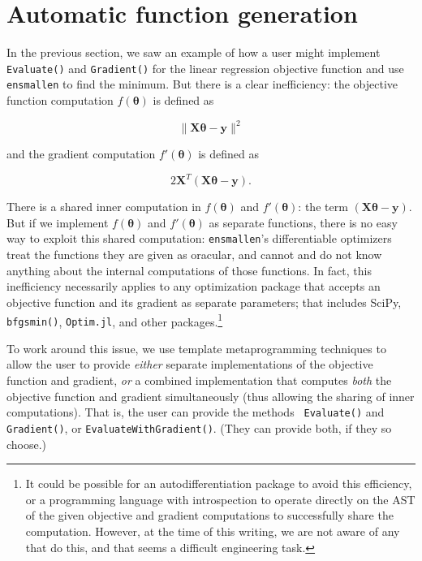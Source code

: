 \section{Automatic function generation}
\label{sec:automatic}

In the previous section, we saw an example of how a user might implement {\tt
Evaluate()} and {\tt Gradient()} for the linear regression objective function
and use {\tt ensmallen} to find the minimum.  But there is a clear inefficiency:
the objective function computation $f(\bm \theta)$ is defined as

\begin{equation*}
\| \bm X \bm \theta - \bm y \|^2
\end{equation*}

\noindent and the gradient computation $f'(\bm \theta)$ is defined as

\begin{equation}
2 \bm X^T (\bm X \bm \theta - \bm y).
\end{equation}

There is a shared inner computation in $f(\bm \theta)$ and $f'(\bm \theta)$: the
term $(\bm X \bm \theta - \bm y)$.  But if we implement $f(\bm \theta)$ and
$f'(\bm \theta)$ as separate functions, there is no easy way to exploit this
shared computation: {\tt ensmallen}'s differentiable optimizers treat the
functions they are given as oracular, and cannot and do not know anything about
the internal computations of those functions.  In fact, this inefficiency
necessarily applies to any optimization package that accepts an objective
function and its gradient as separate parameters; that includes SciPy, {\tt
bfgsmin()}, {\tt Optim.jl}, and other packages.\footnote{It could be possible
for an autodifferentiation package to avoid this efficiency, or a
programming language with introspection to operate directly on the AST of the
given objective and gradient computations to successfully share the computation.
However, at the time of this writing, we are not aware of any that do this, and
that seems a difficult engineering task.}

To work around this issue, we use template metaprogramming techniques to allow
the user to provide {\it either} separate implementations of the objective
function and gradient, {\it or} a combined implementation that computes {\it
both} the objective function and gradient simultaneously (thus allowing the
sharing of inner computations).  That is, the user can provide the methods {\tt
Evaluate()} and {\tt Gradient()}, or {\tt EvaluateWithGradient()}.  (They can
provide both, if they so choose.)

